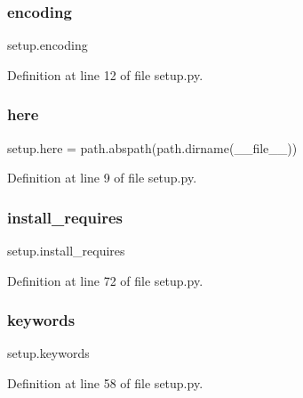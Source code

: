 \subsubsection{\texorpdfstring{encoding}{encoding}}
{\footnotesize\ttfamily setup.\+encoding}



Definition at line 12 of file setup.\+py.

\mbox{\label{namespacesetup_a9c076537d899ffd8096e58c282bb7b02}} 
\subsubsection{\texorpdfstring{here}{here}}
{\footnotesize\ttfamily setup.\+here = path.\+abspath(path.\+dirname(\+\_\+\+\_\+file\+\_\+\+\_\+))}



Definition at line 9 of file setup.\+py.

\mbox{\label{namespacesetup_abead4f26b530856f858f0d44c7cf2588}} 
\subsubsection{\texorpdfstring{install\+\_\+requires}{install\_requires}}
{\footnotesize\ttfamily setup.\+install\+\_\+requires}



Definition at line 72 of file setup.\+py.

\mbox{\label{namespacesetup_a73ae9ecb109f0dcab6f0b6a89043c5c3}} 
\subsubsection{\texorpdfstring{keywords}{keywords}}
{\footnotesize\ttfamily setup.\+keywords}



Definition at line 58 of file setup.\+py.

\mbox{\label{namespacesetup_a8ed6f50a28bd6a8794f8e1153baa6de9}} 
